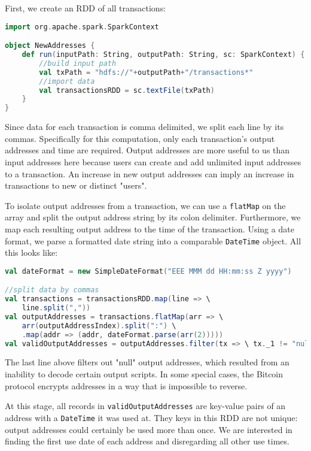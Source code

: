 \documentclass[9pt,twocolumn,twoside]{idsi}
\begin{document}
First, we create an RDD of all transactions:

\begin{lstlisting}[language=Scala]
import org.apache.spark.SparkContext

object NewAddresses {
    def run(inputPath: String, outputPath: String, sc: SparkContext) {
        //build input path
        val txPath = "hdfs://"+outputPath+"/transactions*"
        //import data
        val transactionsRDD = sc.textFile(txPath)
    }
}
\end{lstlisting}

Since data for each transaction is comma delimited, we split each line by its commas. Specifically for this computation, only each transaction's output addresses and time are required. Output addresses are more useful to us than input addresses here because users can create and add unlimited input addresses to a transaction. An increase in new output addresses can imply an increase in transactions to new or distinct "users".

To isolate output addresses from a transaction, we can use a \lstinline{flatMap} on the array and split the output address string by its colon delimiter. Furthermore, we map each resulting output address to the time of the transaction. Using a date format, we parse a formatted date string into a comparable \lstinline{DateTime} object. All this looks like:

\begin{lstlisting}[language=Scala]
val dateFormat = new SimpleDateFormat("EEE MMM dd HH:mm:ss Z yyyy")

//split data by commas
val transactions = transactionsRDD.map(line => \
    line.split(","))
val outputAddresses = transactions.flatMap(arr => \
    arr(outputAddressIndex).split(":") \
    .map(addr => (addr, dateFormat.parse(arr(2)))))
val validOutputAddresses = outputAddresses.filter(tx => \ tx._1 != "null")
\end{lstlisting}

The last line above filters out "null" output addresses, which resulted from an inability to decode certain output scripts. In some special cases, the Bitcoin protocol encrypts addresses in a way that is impossible to reverse.

At this stage, all records in \lstinline{validOutputAddresses} are key-value pairs of an address with a \lstinline{DateTime} it was used at. They keys in this RDD are not unique: output addresses could certainly be used more than once. We are interested in finding the first use date of each address and disregarding all other use times.
\end{document}
